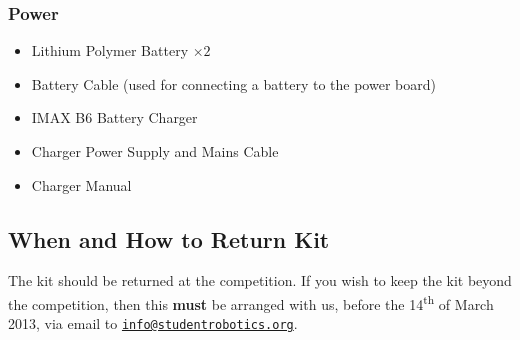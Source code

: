 \subsubsection {Power}

\begin{itemize}
 \item Lithium Polymer Battery $\times 2$
 \item Battery Cable (used for connecting a battery to the power board)
 \item IMAX B6 Battery Charger
 \item Charger Power Supply and Mains Cable
 \item Charger Manual
\end{itemize}

\subsection {When and How to Return Kit}

The kit should be returned at the competition.
If you wish to keep the kit beyond the competition, then this \textbf{must} be arranged with us,
 before the 14\textsuperscript{th} of March 2013, via email to \href{mailto:info@studentrobotics.org}{\nolinkurl{info@studentrobotics.org}}.
